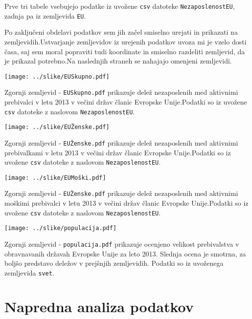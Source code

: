 \documentclass[11pt,a4paper]{article}
\begin{document}
Prve tri tabele vsebujejo podatke iz uvožene \verb|csv| datoteke \verb|NezaposlenostEU|, zadnja pa iz zemljevida \verb|EU|.

Po zaključeni obdelavi podatkov sem jih začel smiselno urejati in prikazati na zemljevidih.Ustvarjanje zemljevidov iz urejenih podatkov uvoza mi je vzelo dosti časa, saj sem moral popraviti tudi koordinate in smiselno razdeliti zemljevid, da je prikazal potrebno.Na naslednjih straneh se nahajajo omenjeni zemljevidi.

\texttt{[image: ../slike/EUSkupno.pdf]}

Zgornji zemljevid - \verb|EUSkupno.pdf| prikazuje delež nezaposlenih med aktivnimi prebivalci v letu 2013 v večini držav članic Evropske Unije.Podatki so iz uvožene \verb|csv| datoteke z naslovom \verb|NezaposlenostEU|.

\texttt{[image: ../slike/EUŽenske.pdf]}

Zgornji zemljevid - \verb|EUŽenske.pdf| prikazuje delež nezaposlenih med aktivnimi prebivalkami v letu 2013 v večini držav članic Evropske Unije.Podatki so iz uvožene \verb|csv| datoteke z naslovom \verb|NezaposlenostEU|.

\texttt{[image: ../slike/EUMoški.pdf]}

Zgornji zemljevid - \verb|EUŽenske.pdf| prikazuje delež nezaposlenih med aktivnimi moškimi prebivalci v letu 2013 v večini držav članic Evropske Unije.Podatki so iz uvožene \verb|csv| datoteke z naslovom \verb|NezaposlenostEU|.

\texttt{[image: ../slike/populacija.pdf]}

Zgornji zemljevid - \verb|populacija.pdf| prikazuje ocenjeno velikost prebivalstva v obravnavanih državah Evropske Unije za leto 2013. Slednja ocena je smotrna, za boljšo predstavo deležov v prejšnjih zemljevidih. Podatki so iz uvoženega zemljevida \verb|svet|.

\pagebreak
\section{Napredna analiza podatkov}
\end{document}
